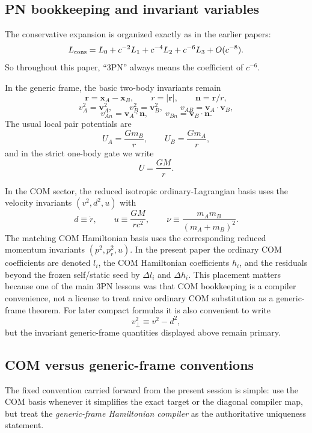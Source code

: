 \documentclass[11pt]{article}
\begin{document}
\subsection{PN bookkeeping and invariant variables}
\label{sec:dict-pn}

The conservative expansion is organized exactly as in the earlier papers:
\[
L_{\rm cons}=L_0+c^{-2}L_1+c^{-4}L_2+c^{-6}L_3+O(c^{-8}).
\]
So throughout this paper, ``$3$PN'' always means the coefficient of $c^{-6}$.

In the generic frame, the basic two-body invariants remain
\[
\mathbf r=\mathbf x_A-\mathbf x_B,
\qquad
r=|\mathbf r|,
\qquad
\mathbf n=\mathbf r/r,
\]
\[
v_A^2=\mathbf v_A^2,
\qquad
v_B^2=\mathbf v_B^2,
\qquad
v_{AB}=\mathbf v_A\!\cdot\!\mathbf v_B,
\]
\[
v_{An}=\mathbf v_A\!\cdot\!\mathbf n,
\qquad
v_{Bn}=\mathbf v_B\!\cdot\!\mathbf n.
\]
The usual local pair potentials are
\[
U_A=\frac{Gm_B}{r},
\qquad
U_B=\frac{Gm_A}{r},
\]
and in the strict one-body gate we write
\[
U=\frac{GM}{r}.
\]

In the COM sector, the reduced isotropic ordinary-Lagrangian basis uses the
velocity invariants $(v^2,d^2,u)$ with
\[
d\equiv \dot r,
\qquad
u\equiv\frac{GM}{rc^2},
\qquad
\nu\equiv\frac{m_A m_B}{(m_A+m_B)^2}.
\]
The matching COM Hamiltonian basis uses the corresponding reduced momentum
invariants $(p^2,p_r^2,u)$.  In the present paper the ordinary COM coefficients
are denoted $l_i$, the COM Hamiltonian coefficients $h_i$, and the residuals
beyond the frozen self/static seed by $\Delta l_i$ and $\Delta h_i$.
This placement matters because one of the main $3$PN lessons was that COM
bookkeeping is a compiler convenience, not a license to treat naive ordinary COM
substitution as a generic-frame theorem.  For later compact formulas it is also
convenient to write
\[
v_\perp^2\equiv v^2-d^2,
\]
but the invariant generic-frame quantities displayed above remain primary.

\subsection{COM versus generic-frame conventions}
\label{sec:dict-com-generic}

The fixed convention carried forward from the present session is simple:
use the COM basis whenever it simplifies the exact target or the diagonal
compiler map, but treat the \emph{generic-frame Hamiltonian compiler} as the
authoritative uniqueness statement.
\end{document}
